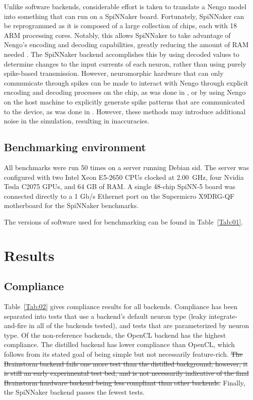 \documentclass{frontiersSCNS}
\providecommand{\DIFdel}[1]{{\protect\color{red}\sout{#1}}}                      %
\providecommand{\DIFdelbegin}{} %
\providecommand{\DIFdelend}{} %
\begin{document}
Unlike software backends,
considerable effort is taken
to translate a Nengo model into
something that can run on a SpiNNaker board.
Fortunately, SpiNNaker can be reprogrammed
as it is composed of a large collection
of chips, each with 18 ARM processing cores.
Notably, this allows SpiNNaker
to take advantage of Nengo's
encoding and decoding capabilities,
greatly reducing the amount of RAM needed
\citep{mundy2015}.
The SpiNNaker backend accomplishes this
by using decoded values to determine
changes to the input currents of each neuron,
rather than using purely
spike-based transmission.
However, neuromorphic hardware that
can only communicate through spikes
can be made to interact with Nengo
through explicit encoding and decoding processes
on the chip, as was done in \citet{galluppi2012},
or by using Nengo on the host machine
to explicitly generate spike patterns
that are communicated to the device,
as was done in \citet{choudhary2012}.
However, these methods may introduce
additional noise in the simulation,
resulting in inaccuracies.

\subsection{Benchmarking environment}

All benchmarks were run 50 times
on a server running Debian sid.
The server was configured with
two Intel Xeon E5-2650 CPUs
clocked at 2.00~GHz,
four Nvidia Tesla C2075 GPUs,
and 64 GB of RAM.
A single 48-chip SpiNN-5 board
was connected directly to
a 1 Gb/s Ethernet port on
the Supermicro X9DRG-QF motherboard
for the SpiNNaker benchmarks.

The versions of software
used for benchmarking can be found in
Table~\ref{Tab:01}.

\section{Results}

\subsection{Compliance}
Table~\ref{Tab:02} gives compliance results for all backends.
Compliance has been separated into tests
that use a backend's default neuron type
(leaky integrate-and-fire in all of the backends tested),
and tests that are parameterized by neuron type.
Of the non-reference backends,
the OpenCL backend has the highest compliance.
The distilled backend has lower compliance
than OpenCL, which follows from its stated goal
of being simple but not necessarily feature-rich.
\DIFdelbegin \DIFdel{The Brainstorm backend fails one more test
than the distilled background;
however, it is still an early experimental test bed,
and is not necessarily indicative of the
final Brainstorm hardware backend being
less compliant than other backends.
}\DIFdelend Finally, the SpiNNaker backend
passes the fewest tests.
\end{document}
